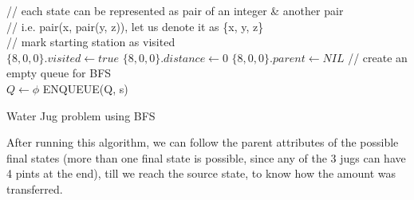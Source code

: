 \documentclass[12pt]{report}
\begin{document}
\begin{algorithm}[H]
	\SetAlgoLined
	// each state can be represented as pair of an integer \& another pair \\
	// i.e. pair(x, pair(y, z)), let us denote it as \{x, y, z\} \\
	// mark starting station as visited \\
	$\{8,0,0\}.visited \gets true $ \;
	$\{8,0,0\}.distance \gets 0 $ \;
	$\{8,0,0\}.parent \gets NIL $\;
	// create an empty queue for BFS \\
	$Q \gets \phi $ \;
	ENQUEUE(Q, s) \;
	\caption{Water Jug problem using BFS}	
\end{algorithm}
After running this algorithm, we can follow the parent attributes of the possible final states (more than one final state is possible, since any of the 3 jugs can have 4 pints at the end), till we reach the source state, to know how the amount was transferred. 
\end{document}
